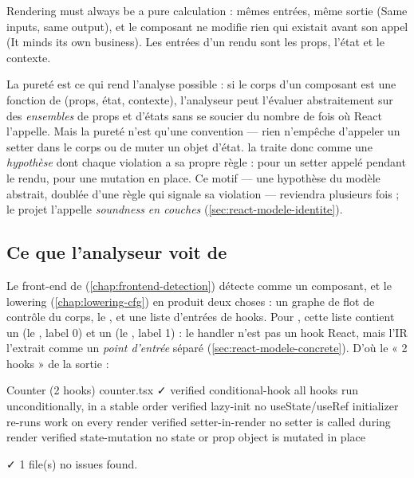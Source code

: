 \begin{react}
\og Rendering must always be a pure calculation\fg{} \cite{ReactRenderCommit} :
mêmes entrées, même sortie (\og Same inputs, same output\fg{}), et le composant
ne modifie rien qui existait avant son appel (\og It minds its own business\fg{}).
Les entrées d'un rendu sont les props, l'état et le contexte.
\end{react}

La pureté est ce qui rend l'analyse possible : si le corps d'un composant est
une fonction de (props, état, contexte), l'analyseur peut l'évaluer
abstraitement sur des \emph{ensembles} de props et d'états sans se soucier du
nombre de fois où React l'appelle. Mais la pureté n'est qu'une convention ---
rien n'empêche d'appeler un setter dans le corps ou de muter un objet d'état.
\reactant{} la traite donc comme une \emph{hypothèse} dont chaque violation a sa
propre règle :  pour un setter appelé pendant le rendu,
 pour une mutation en place. Ce motif --- une hypothèse du
modèle abstrait, doublée d'une règle qui signale sa violation --- reviendra
plusieurs fois ; le projet l'appelle \emph{soundness en couches}
(\cref{sec:react-modele-identite}).

\subsection{Ce que l'analyseur voit de }

Le front-end de \reactant{} (\cref{chap:frontend-detection}) détecte
 comme un composant, et le lowering (\cref{chap:lowering-cfg}) en
produit deux choses : un graphe de flot de contrôle du corps, le
, et une liste d'entrées de hooks. Pour , cette
liste contient un  (le , label 0) et un
 (le , label 1) : le handler n'est pas un
hook React, mais l'IR l'extrait comme un \emph{point d'entrée} séparé
(\cref{sec:react-modele-concrete}). D'où le « 2 hooks » de la sortie :

\begin{sortie}
  Counter  (2 hooks)  counter.tsx  ✓
    verified  conditional-hook  all hooks run unconditionally, in a stable order
    verified  lazy-init  no useState/useRef initializer re-runs work on every render
    verified  setter-in-render  no setter is called during render
    verified  state-mutation  no state or prop object is mutated in place

✓  1 file(s) no issues found.
\end{sortie}

